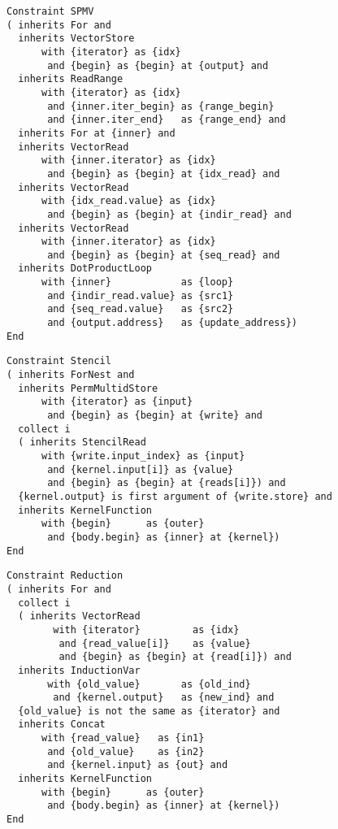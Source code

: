 \begin{figure}[p]
\begin{lstlisting}[language={constraints},
                   label={fig:spmv},caption={IDL specification of SPMV}]
Constraint SPMV
( inherits For and
  inherits VectorStore
      with {iterator} as {idx}
       and {begin} as {begin} at {output} and
  inherits ReadRange
      with {iterator} as {idx} 
       and {inner.iter_begin} as {range_begin} 
       and {inner.iter_end}   as {range_end} and
  inherits For at {inner} and
  inherits VectorRead
      with {inner.iterator} as {idx}
       and {begin} as {begin} at {idx_read} and
  inherits VectorRead
      with {idx_read.value} as {idx}
       and {begin} as {begin} at {indir_read} and
  inherits VectorRead
      with {inner.iterator} as {idx}
       and {begin} as {begin} at {seq_read} and
  inherits DotProductLoop
      with {inner}            as {loop}
       and {indir_read.value} as {src1}
       and {seq_read.value}   as {src2}
       and {output.address}   as {update_address})
End
\end{lstlisting}
\end{figure}

\begin{figure}[p]
\begin{lstlisting}[language={constraints},
                   label={fig:stencilcompute},caption={IDL specification of simple stencil}]
Constraint Stencil
( inherits ForNest and
  inherits PermMultidStore
      with {iterator} as {input} 
       and {begin} as {begin} at {write} and
  collect i
  ( inherits StencilRead
      with {write.input_index} as {input}
       and {kernel.input[i]} as {value}
       and {begin} as {begin} at {reads[i]}) and
  {kernel.output} is first argument of {write.store} and
  inherits KernelFunction
      with {begin}      as {outer}
       and {body.begin} as {inner} at {kernel})
End
\end{lstlisting}
\end{figure}

\begin{figure}[p]
\begin{lstlisting}[language={constraints},
                   label={fig:scalarreduction},caption=
   {IDL specification of scalar reductions}]
Constraint Reduction
( inherits For and
  collect i
  ( inherits VectorRead
        with {iterator}         as {idx}
         and {read_value[i]}    as {value}
         and {begin} as {begin} at {read[i]}) and
  inherits InductionVar
       with {old_value}       as {old_ind}
        and {kernel.output}   as {new_ind} and
  {old_value} is not the same as {iterator} and
  inherits Concat
      with {read_value}   as {in1}
       and {old_value}    as {in2}
       and {kernel.input} as {out} and
  inherits KernelFunction
      with {begin}      as {outer}
       and {body.begin} as {inner} at {kernel})
End
\end{lstlisting}
\end{figure}